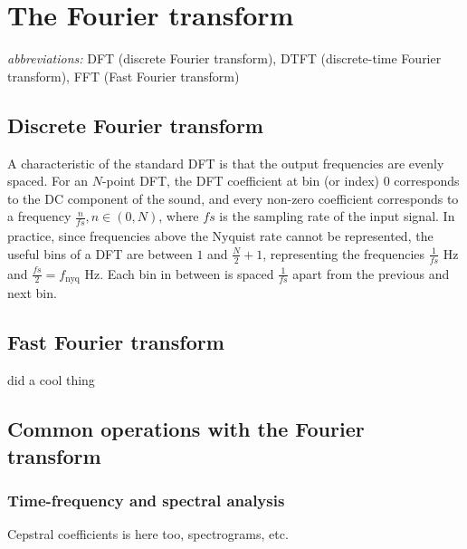 \documentclass[letter,12pt,notitlepage]{article}
\begin{document}
\vfill
\clearpage

\section{The Fourier transform}
\label{sec:theorystandard}

\qquad \textit{abbreviations:} DFT (discrete Fourier transform), DTFT (discrete-time Fourier transform), FFT (Fast Fourier transform)


\subsection{Discrete Fourier transform}


A characteristic of the standard DFT is that the output frequencies are evenly spaced. For an $N$-point DFT, the DFT coefficient at bin (or index) 0 corresponds to the DC component of the sound, and every non-zero coefficient corresponds to a frequency $\frac{n}{\mathit{fs}}, n \in (0, N)$, where $\mathit{fs}$ is the sampling rate of the input signal. In practice, since frequencies above the Nyquist rate cannot be represented, the useful bins of a DFT are between $1$ and $\frac{N}{2}+1$, representing the frequencies $\frac{1}{\mathit{fs}}$ Hz and $\frac{\mathit{fs}}{2} = f_{\text{nyq}}$ Hz. Each bin in between is spaced $\frac{1}{\mathit{fs}}$ apart from the previous and next bin.


\subsection{Fast Fourier transform}

\citet{cooleytukey} did a cool thing

\subsection{Common operations with the Fourier transform}

\subsubsection{Time-frequency and spectral analysis}

Cepstral coefficients is here too, spectrograms, etc.
\end{document}
